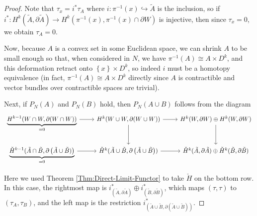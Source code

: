 \documentclass[reqno]{amsart}
\theoremstyle{definition}
\theoremstyle{remark}
\begin{document}
\begin{proof}
     Note that
     $\tau_x = i^{*} \tau_A$ where 
     $i \colon \pi^{-1}(x) \hookrightarrow \tilde{A}$ is the inclusion, so
     if $i^{*} \colon
     H^{k}(\tilde{A}, \partial \tilde{A}) \to 
     H^{k}\left( \pi^{-1}(x), \pi^{-1}(x) \cap \partial W \right)$
     is injective, then since
     $\tau_x = 0$, we obtain $\tau_A = 0$.


     Now, because $A$ is a convex set in some
     Euclidean space, we can shrink $A$ to be small enough
     so that, when considered in $N$, we have
     $\pi^{-1}(A) \cong A \times D^{k}$, and this deformation retract
     onto $\left\{ x \right\} \times D^{k}$, so
     indeed $i$ must be a homotopy equivalence (in fact,
     $\pi^{-1}(A) \cong A \times D^{k}$ directly since
     $A$ is contractible and vector bundles over contractible spaces are
     trivial).


     Next, if $P_N(A)$ and $P_N(B)$ hold, then $P_N(A \cup B)$ follows
     from the diagram
     \begin{equation*}
     \begin{tikzcd}
         \underbrace{H^{k-1}(W \cap W, \partial (W \cap W))}_{= 0}
         \ar[r] & H^{k}(W \cup W, \partial (W \cup W))
         \ar[d] \ar[r] & H^{k}(W, \partial W) \oplus H^{k}(W, \partial W)
         \ar[d] \\ 
         \underbrace{\check{H}^{k-1} (\tilde{A} \cap
         \tilde{B}, \partial \left( \tilde{A} \cup \tilde{B})
 \right)}_{= 0} \ar[r] & \check{H}^{k}(\tilde{A} \cup \tilde{B},
         \partial \left( \tilde{A} \cup \tilde{B} \right) ) \ar[r] &
         \check{H}^{k}(\tilde{A}, \partial \tilde{A}) \oplus
         \check{H}^{k}(\tilde{B}, \partial \tilde{B})
     \end{tikzcd}
     \end{equation*}


     Here we used Theorem \ref{Thm:Direct-Limit-Functor} to take
     $\check{H}$ on the bottom row. In this case,
     the rightmost map is
     $i_{\left( \tilde{A}, \partial \tilde{A} \right) }^{*} 
     \oplus i_{\left( \tilde{B}, \partial \tilde{B} \right) }^{*}$, which
     maps $\left( \tau, \tau \right) $ to
     $\left( \tau_A, \tau_B \right) $, and the left
     map is the restriction
     $i_{\left( \tilde{A} \cup \tilde{B}, 
     \partial \left( \tilde{A} \cup \tilde{B} \right) \right) }^{*}$.


\end{proof}
\end{document}
